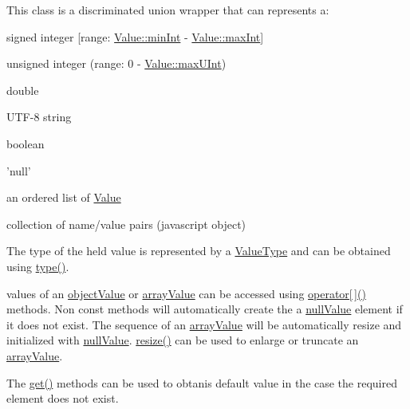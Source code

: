 This class is a discriminated union wrapper that can represents a\-:
\begin{DoxyItemize}
\item signed integer \mbox{[}range\-: \hyperlink{classJson_1_1Value_ad062d227e00408ce594026959d6ed2e1}{Value\-::min\-Int} -\/ \hyperlink{classJson_1_1Value_af13109d78a22923e397dc2b60a74714c}{Value\-::max\-Int}\mbox{]}
\item unsigned integer (range\-: 0 -\/ \hyperlink{classJson_1_1Value_a905f07575ee561e5b0f0a57e8ea31462}{Value\-::max\-U\-Int})
\item double
\item U\-T\-F-\/8 string
\item boolean
\item 'null'
\item an ordered list of \hyperlink{classJson_1_1Value}{Value}
\item collection of name/value pairs (javascript object)
\end{DoxyItemize}

The type of the held value is represented by a \hyperlink{namespaceJson_a7d654b75c16a57007925868e38212b4e}{Value\-Type} and can be obtained using \hyperlink{classJson_1_1Value_a695ef31fad36b4712918b3ff80158479}{type()}.

values of an \hyperlink{namespaceJson_a7d654b75c16a57007925868e38212b4ea6ca35c0a30ea3d1b8ec95c2d1e41a1a8}{object\-Value} or \hyperlink{namespaceJson_a7d654b75c16a57007925868e38212b4eaa3025bfd271ef0b0c7c030c9118f8be7}{array\-Value} can be accessed using \hyperlink{classJson_1_1Value_a83267de2c43047529d90f35ced020ba9}{operator\mbox{[}$\,$\mbox{]}()} methods. Non const methods will automatically create the a \hyperlink{namespaceJson_a7d654b75c16a57007925868e38212b4ea99922f3ccd58446e80e6055a7119b640}{null\-Value} element if it does not exist. The sequence of an \hyperlink{namespaceJson_a7d654b75c16a57007925868e38212b4eaa3025bfd271ef0b0c7c030c9118f8be7}{array\-Value} will be automatically resize and initialized with \hyperlink{namespaceJson_a7d654b75c16a57007925868e38212b4ea99922f3ccd58446e80e6055a7119b640}{null\-Value}. \hyperlink{classJson_1_1Value_a9ac3948baaa27f9f7bbf65fa8301484f}{resize()} can be used to enlarge or truncate an \hyperlink{namespaceJson_a7d654b75c16a57007925868e38212b4eaa3025bfd271ef0b0c7c030c9118f8be7}{array\-Value}.

The \hyperlink{classJson_1_1Value_aff2e3a2e9fd5db5469588ab7b501d4db}{get()} methods can be used to obtanis default value in the case the required element does not exist.

